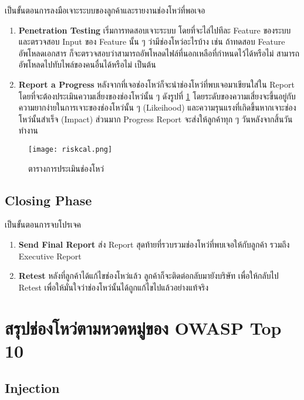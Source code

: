 เป็นขั้นตอนการลงมือเจาะระบบของลูกค้าและรายงานช่องโหว่ที่พอเจอ

\begin{enumerate}
	\item \textbf{Penetration Testing} เริ่มการทดสอบเจาะระบบ โดยที่จะไล่ไปทีละ Feature ของระบบ และตรวจสอบ Input ของ Feature นั้น ๆ ว่ามีช่องโหว่อะไรบ้าง เช่น ถ้าทดสอบ Feature อัพโหลดเอกสาร ก็จะตรวจสอบว่าสามารถอัพโหลดไฟล์ที่นอกเหลือที่กำหนดไว้ได้หรือไม่  สามารถอัพโหลดไปทับไพล์ของคนอื่นได้หรือไม่ เป็นต้น
	\item \textbf{Report a Progress} หลังจากที่เจอช่องโหว่ก็จะนำช่องโหว่ที่พบเจอมาเขียนใส่ใน Report โดยที่จะต้องประเมินความเสี่ยงของช่องโหว่นั้น ๆ ดังรูปที่ \ref{Fig:riskcal} โดยระดับของความเสี่ยงจะขึ้นอยู่กับความยากง่ายในการเจาะของช่องโหว่นั้น ๆ (Likeihood) และความรุนแรงที่เกิดขึ้นหากเจาะช่องโหว่นั้นสำเร็จ (Impact) ส่วนมาก Progress Report จะส่งให้ลูกค้าทุก ๆ  วันหลังจากสิ้นวันทำงาน
	
\end{enumerate}

\begin{figure}[h]
	\centering
	\texttt{[image: riskcal.png]}
	\caption{ตารางการประเมินช่องโหว่}
	\label{Fig:riskcal}
\end{figure}

\subsection{Closing Phase}

เป็นขั้นตอนการจบโปรเจค

\begin{enumerate}
	\item \textbf{Send Final Report} ส่ง Report สุดท้ายที่รวบรวมช่องโหว่ที่พบเจอให้กับลูกค้า รวมถึง Executive Report
	\item \textbf{Retest} หลังที่ลูกค้าได้แก้ไขช่องโหว่แล้ว ลูกค้าก็จะติดต่อกลับมายังบริษัท เพื่อให้กลับไป Retest เพื่อให้มั่นใจว่าช่องโหว่นั้นได้ถูกแก้ไขไปแล้วอย่างแท้จริง
\end{enumerate}

\section{สรุปช่องโหว่ตามหวดหมู่ของ OWASP Top 10}

\subsection{Injection}

